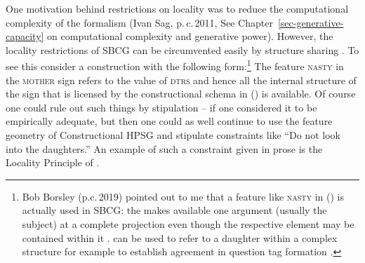 
One motivation behind restrictions on locality was to reduce the computational complexity of the
formalism (Ivan Sag, p.\,c.\,2011, See Chapter~\ref{sec-generative-capacity} on computational complexity and generative power).
However, the locality restrictions of SBCG can be circumvented easily by structure sharing \citep[Section~9.6.1]{MuellerGTBuch2}. To see this consider a
construction with the following form:\footnote{%
  Bob Borsley (p.c.\,2019) pointed out to me that a feature like \textsc{nasty} in () is actually used in
SBCG: the \xargf{} makes available one argument (usually the subject) at a complete projection even
though the respective element may be contained within it \citep[]{Sag2012a}. \xarg can be used to refer to a daughter
within a complex structure for example to establish agreement in question tag formation \citep{BF99a}.
}
\ea
{}
\z
The feature \textsc{nasty} in the \textsc{mother} sign refers to the value of \textsc{dtrs} and hence all the
internal structure of the sign that is licensed by the constructional schema in () is
available. Of course one could rule out such things by stipulation -- if one considered it
to be empirically adequate, but then one could as well continue to use the feature geometry of
Constructional HPSG \citep{Sag97a} and stipulate constraints like ``Do not look into the
daughters.'' An example of such a constraint given in prose is the Locality Principle of
\citet[--144]{ps}.


